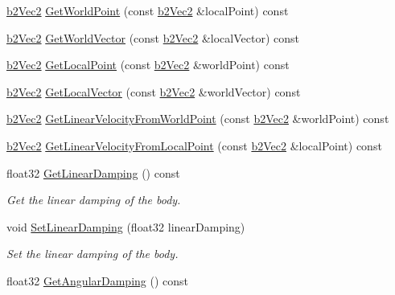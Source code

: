 \begin{DoxyCompactItemize}
\item 
\hyperlink{structb2Vec2}{b2\+Vec2} \hyperlink{classb2Body_a712b782c61963c6f07beca86acc631ae}{Get\+World\+Point} (const \hyperlink{structb2Vec2}{b2\+Vec2} \&local\+Point) const
\item 
\hyperlink{structb2Vec2}{b2\+Vec2} \hyperlink{classb2Body_ae8c434785b2a730f7c385e708b345bb6}{Get\+World\+Vector} (const \hyperlink{structb2Vec2}{b2\+Vec2} \&local\+Vector) const
\item 
\hyperlink{structb2Vec2}{b2\+Vec2} \hyperlink{classb2Body_a0df8f4312ab23223489323326b2d763d}{Get\+Local\+Point} (const \hyperlink{structb2Vec2}{b2\+Vec2} \&world\+Point) const
\item 
\hyperlink{structb2Vec2}{b2\+Vec2} \hyperlink{classb2Body_aed2f88179cedf4cdbdc47429ebe41288}{Get\+Local\+Vector} (const \hyperlink{structb2Vec2}{b2\+Vec2} \&world\+Vector) const
\item 
\hyperlink{structb2Vec2}{b2\+Vec2} \hyperlink{classb2Body_a5bc9a483e5f59199daa1751786034c1d}{Get\+Linear\+Velocity\+From\+World\+Point} (const \hyperlink{structb2Vec2}{b2\+Vec2} \&world\+Point) const
\item 
\hyperlink{structb2Vec2}{b2\+Vec2} \hyperlink{classb2Body_a0ac0a4ad6ac3c7804652d9994239dcbd}{Get\+Linear\+Velocity\+From\+Local\+Point} (const \hyperlink{structb2Vec2}{b2\+Vec2} \&local\+Point) const
\item 
\mbox{\label{classb2Body_aff6bc518ea0f07fa5bba7cb7782e86d1}} 
float32 \hyperlink{classb2Body_aff6bc518ea0f07fa5bba7cb7782e86d1}{Get\+Linear\+Damping} () const
\begin{DoxyCompactList}\small\item\em Get the linear damping of the body. \end{DoxyCompactList}\item 
\mbox{\label{classb2Body_a909f9753ad700f70282a56e00bc182a5}} 
void \hyperlink{classb2Body_a909f9753ad700f70282a56e00bc182a5}{Set\+Linear\+Damping} (float32 linear\+Damping)
\begin{DoxyCompactList}\small\item\em Set the linear damping of the body. \end{DoxyCompactList}\item 
\mbox{\label{classb2Body_a151f5e81e44037883f61b67821704999}} 
float32 \hyperlink{classb2Body_a151f5e81e44037883f61b67821704999}{Get\+Angular\+Damping} () const

\end{DoxyCompactItemize}
